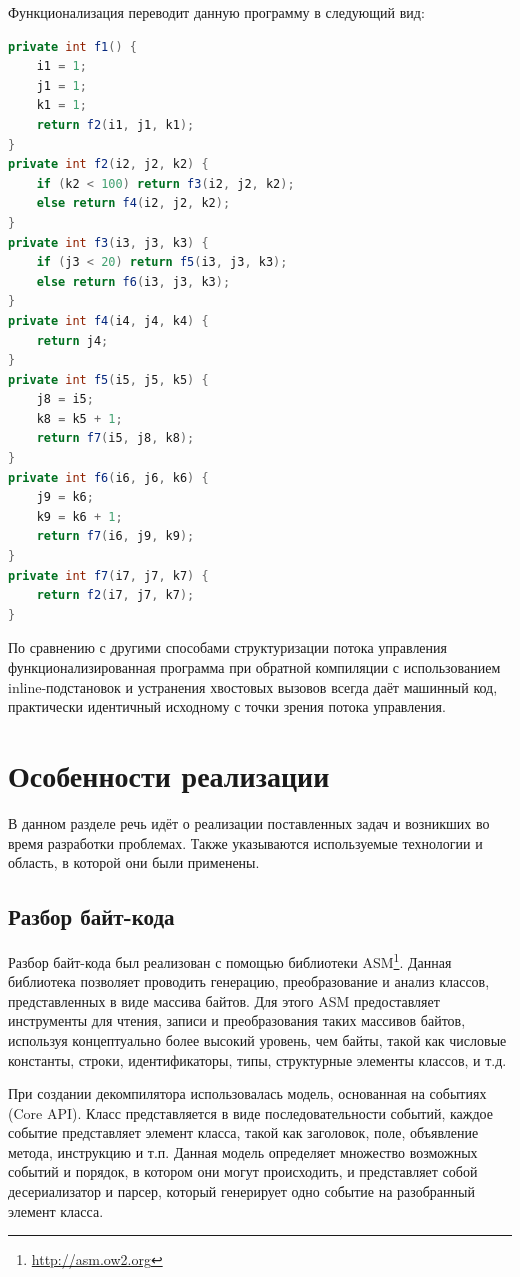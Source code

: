 Функционализация переводит данную программу в следующий вид:\\
\begin{lstlisting}[frame = single, language = Java]
private int f1() {
	i1 = 1;
	j1 = 1;
	k1 = 1;
	return f2(i1, j1, k1);
}
private int f2(i2, j2, k2) {
	if (k2 < 100) return f3(i2, j2, k2);
	else return f4(i2, j2, k2);	
}
private int f3(i3, j3, k3) {
	if (j3 < 20) return f5(i3, j3, k3);
	else return f6(i3, j3, k3);	
}
private int f4(i4, j4, k4) {
	return j4;
}
private int f5(i5, j5, k5) {
	j8 = i5;
	k8 = k5 + 1;
	return f7(i5, j8, k8);
}
private int f6(i6, j6, k6) {
	j9 = k6;
	k9 = k6 + 1;
	return f7(i6, j9, k9);
}
private int f7(i7, j7, k7) {
	return f2(i7, j7, k7);
}\end{lstlisting}
\vspace{0.2cm}

По сравнению с другими способами структуризации потока управления функционализированная программа при обратной компиляции с использованием inline-подстановок и устранения хвостовых вызовов всегда даёт машинный код, практически идентичный исходному с точки зрения потока управления.

\section{Особенности реализации}

В данном разделе речь идёт о реализации поставленных задач и возникших во время разработки проблемах. Также указываются используемые технологии и область, в которой они были применены.

\subsection{Разбор байт-кода}

Разбор байт-кода был реализован с помощью библиотеки ASM\footnote{\url{http://asm.ow2.org}}. Данная библиотека позволяет проводить генерацию, преобразование и анализ классов, представленных в виде массива байтов. Для этого ASM предоставляет инструменты для чтения, записи и преобразования таких массивов байтов, используя концептуально более высокий уровень, чем байты, такой как числовые константы, строки, идентификаторы, типы, структурные элементы классов, и т.д. 	

При создании декомпилятора использовалась модель, основанная на событиях (Core API). Класс представляется в виде последовательности событий, каждое событие представляет элемент класса, такой как заголовок, поле, объявление метода, инструкцию и т.п. Данная модель определяет множество возможных событий и порядок, в котором они могут происходить, и представляет собой десериализатор и парсер, который генерирует одно событие на разобранный элемент класса\cite{asm}.

